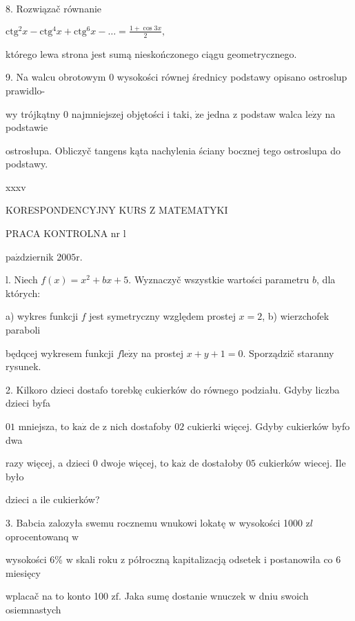 \documentclass[a4paper,12pt]{article}
\begin{document}
8. Rozwiązač równanie

$\displaystyle \mathrm{c}\mathrm{t}\mathrm{g}^{2}x-\mathrm{c}\mathrm{t}\mathrm{g}^{4}x+\mathrm{c}\mathrm{t}\mathrm{g}^{6}x-\ldots=\frac{1+\cos 3x}{2},$

którego lewa strona jest sumą nieskończonego ciągu geometrycznego.

9. Na walcu obrotowym $0$ wysokości równej średnicy podstawy opisano ostroslup prawidlo-

wy trójkątny $0$ najmniejszej objętości $\mathrm{i}$ taki, $\dot{\mathrm{z}}\mathrm{e}$ jedna $\mathrm{z}$ podstaw walca $\mathrm{l}\mathrm{e}\dot{\mathrm{z}}\mathrm{y}$ na podstawie

ostrosłupa. Obliczyč tangens kąta nachylenia ściany bocznej tego ostroslupa do podstawy.







xxxv

KORESPONDENCYJNY KURS Z MATEMATYKI

PRACA KONTROLNA nr l

$\mathrm{p}\mathrm{a}\acute{\mathrm{z}}$dziernik 2$005\mathrm{r}.$

l. Niech $f(x) = x^{2}+bx+5$. Wyznaczyč wszystkie wartości parametru $b$, dla których:

a) wykres funkcji $f$ jest symetryczny względem prostej $x=2$, b) wierzchofek paraboli

będqcej wykresem funkcji $f\mathrm{l}\mathrm{e}\dot{\mathrm{z}}\mathrm{y}$ na prostej $x+y+1=0$. Sporządzič staranny rysunek.

2. Kilkoro dzieci dostafo torebkę cukierków do równego podziału. Gdyby liczba dzieci byfa

$01$ mniejsza, to $\mathrm{k}\mathrm{a}\dot{\mathrm{z}}$ de $\mathrm{z}$ nich dostafoby $02$ cukierki więcej. Gdyby cukierków byfo dwa

razy więcej, a dzieci $0$ dwoje więcej, to $\mathrm{k}\mathrm{a}\dot{\mathrm{z}}$ de dostałoby $05$ cukierków wiecej. Ile było

dzieci a ile cukierków?

3. Babcia zalozyła swemu rocznemu wnukowi lokatę $\mathrm{w}$ wysokości 1000 $\mathrm{z}l$ oprocentowanq $\mathrm{w}$

wysokości 6\% $\mathrm{w}$ skali roku $\mathrm{z}$ półroczną kapitalizacją odsetek $\mathrm{i}$ postanowiła co 6 miesięcy

wplacač na to konto 100 $\mathrm{z}\mathrm{f}$. Jaka sumę dostanie wnuczek $\mathrm{w}$ dniu swoich osiemnastych
\end{document}
